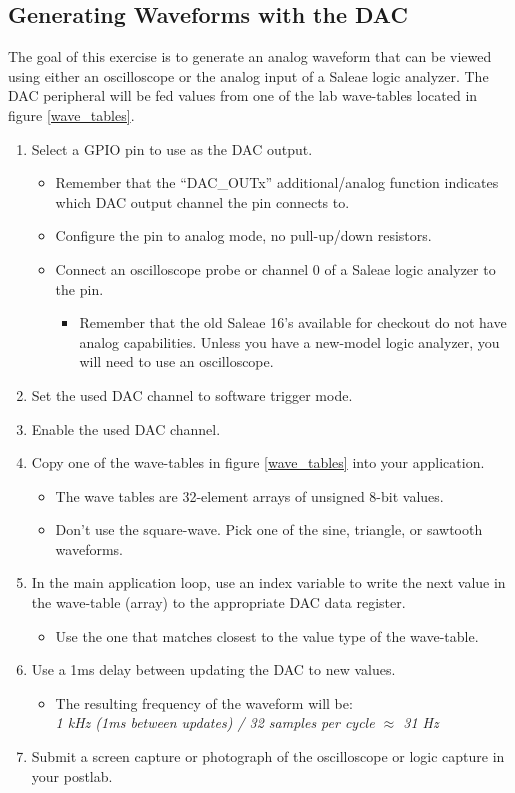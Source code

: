 \documentclass[11pt,fleqn]{book} %
\begin{document}
\subsection{Generating Waveforms with the DAC}
The goal of this exercise is to generate an analog waveform that can be viewed using either an oscilloscope or the analog input of a Saleae logic analyzer. The DAC peripheral will be fed values from one of the lab wave-tables located in figure \ref{wave_tables}.

\begin{enumerate}
    \item Select a GPIO pin to use as the DAC output.
    \begin{itemize}
        \item Remember that the ``DAC\_OUTx'' additional/analog function indicates which DAC output channel the pin connects to. 
        \item Configure the pin to analog mode, no pull-up/down resistors.
        \item Connect an oscilloscope probe or channel 0 of a Saleae logic analyzer to the pin.
        \begin{itemize}
            \item Remember that the old Saleae 16's available for checkout do not have analog capabilities. Unless you have a new-model logic analyzer, you will need to use an oscilloscope. 
        \end{itemize}    
    \end{itemize}
    \item Set the used DAC channel to software trigger mode. 
    \item Enable the used DAC channel. 
    \item Copy one of the wave-tables in figure \ref{wave_tables} into your application. 
    \begin{itemize}
        \item The wave tables are 32-element arrays of unsigned 8-bit values.
        \item Don't use the square-wave. Pick one of the sine, triangle, or sawtooth waveforms. 
    \end{itemize}
    \item In the main application loop, use an index variable to write the next value in the wave-table (array) to the appropriate DAC data register. 
    \begin{itemize}
        \item Use the one that matches closest to the value type of the wave-table.
    \end{itemize}
    \item Use a 1ms delay between updating the DAC to new values. 
    \begin{itemize}
        \item The resulting frequency of the waveform will be: \\ \textit{1 kHz (1ms between updates) / 32 samples per cycle $\approx$ 31 Hz}
    \end{itemize}
    \item Submit a screen capture or photograph of the oscilloscope or logic capture in your postlab.
\end{enumerate}
\end{document}
